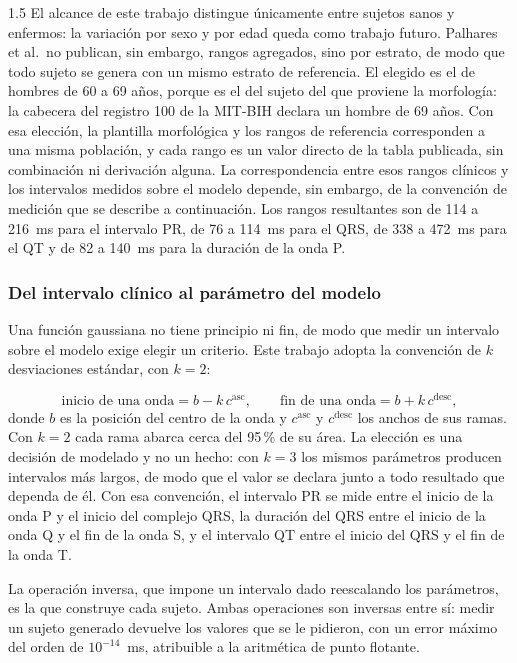 \begin{spacing}{1.5}
El alcance de este trabajo distingue únicamente entre sujetos sanos y enfermos: la variación por sexo y por edad queda como trabajo futuro. Palhares et al.\ no publican, sin embargo, rangos agregados, sino por estrato, de modo que todo sujeto se genera con un mismo estrato de referencia. El elegido es el de hombres de 60 a 69 años, porque es el del sujeto del que proviene la morfología: la cabecera del registro 100 de la MIT-BIH \cite{moody2001impact} declara un hombre de 69 años. Con esa elección, la plantilla morfológica y los rangos de referencia corresponden a una misma población, y cada rango es un valor directo de la tabla publicada, sin combinación ni derivación alguna. La correspondencia entre esos rangos clínicos y los intervalos medidos sobre el modelo depende, sin embargo, de la convención de medición que se describe a continuación. Los rangos resultantes son de 114 a 216~ms para el intervalo PR, de 76 a 114~ms para el QRS, de 338 a 472~ms para el QT y de 82 a 140~ms para la duración de la onda P.

\subsubsection{Del intervalo clínico al parámetro del modelo}

Una función gaussiana no tiene principio ni fin, de modo que medir un intervalo sobre el modelo exige elegir un criterio. Este trabajo adopta la convención de $k$ desviaciones estándar, con $k = 2$:

\begin{equation}
\text{inicio de una onda} = b - k\,c^{\text{asc}}, \qquad
\text{fin de una onda} = b + k\,c^{\text{desc}},
\end{equation}
donde $b$ es la posición del centro de la onda y $c^{\text{asc}}$ y $c^{\text{desc}}$ los anchos de sus ramas. Con $k = 2$ cada rama abarca cerca del 95\,\% de su área. La elección es una decisión de modelado y no un hecho: con $k = 3$ los mismos parámetros producen intervalos más largos, de modo que el valor se declara junto a todo resultado que dependa de él. Con esa convención, el intervalo PR se mide entre el inicio de la onda P y el inicio del complejo QRS, la duración del QRS entre el inicio de la onda Q y el fin de la onda S, y el intervalo QT entre el inicio del QRS y el fin de la onda T.

La operación inversa, que impone un intervalo dado reescalando los parámetros, es la que construye cada sujeto. Ambas operaciones son inversas entre sí: medir un sujeto generado devuelve los valores que se le pidieron, con un error máximo del orden de $10^{-14}$~ms, atribuible a la aritmética de punto flotante.


\end{spacing}
